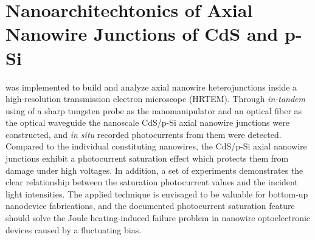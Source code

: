 

\chapter{Nanoarchitechtonics of Axial Nanowire Junctions of CdS and p-Si}

 was implemented to build and analyze axial nanowire heterojunctions inside a high-resolution transmission electron microscope (HRTEM). Through {\em in-tandem} using of a sharp tungsten probe as the nanomanipulator and an optical fiber as the optical waveguide the nanoscale CdS/p-Si axial nanowire junctions were constructed, and \textit{in situ} recorded photocurrents from them were detected. Compared to the individual constituting nanowires, the CdS/p-Si axial nanowire junctions exhibit a photocurrent saturation effect which protects them from damage under high voltages. In addition, a set of experiments demonstrates the clear relationship between the saturation photocurrent values and the incident light intensities. The applied technique is envisaged to be valuable for bottom-up nanodevice fabrications, and the documented photocurrent saturation feature should solve the Joule heating-induced failure problem in nanowire optoelectronic devices caused by a fluctuating bias. 

